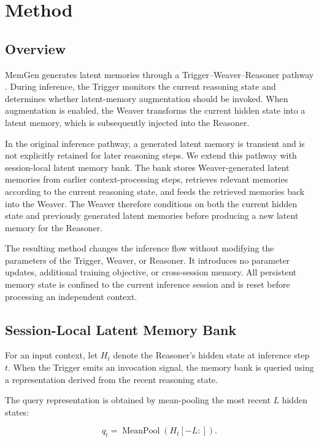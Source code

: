 \section{Method}
\label{sec:method}

\subsection{Overview}

MemGen generates latent memories through a Trigger--Weaver--Reasoner pathway \cite{zhang2025memgen}. During inference, the Trigger monitors the current reasoning state and determines whether latent-memory augmentation should be invoked. When augmentation is enabled, the Weaver transforms the current hidden state into a latent memory, which is subsequently injected into the Reasoner.

In the original inference pathway, a generated latent memory is transient and is not explicitly retained for later reasoning steps. We extend this pathway with session-local latent memory bank. The bank stores Weaver-generated latent memories from earlier context-processing steps, retrieves relevant memories according to the current reasoning state, and feeds the retrieved memories back into the Weaver. The Weaver therefore conditions on both the current hidden state and previously generated latent memories before producing a new latent memory for the Reasoner.

The resulting method changes the inference flow without modifying the parameters of the Trigger, Weaver, or Reasoner. It introduces no parameter updates, additional training objective, or cross-session memory. All persistent memory state is confined to the current inference session and is reset before processing an independent context.

\subsection{Session-Local Latent Memory Bank}

For an input context, let $H_t$ denote the Reasoner's hidden state at inference step $t$. When the Trigger emits an invocation signal, the memory bank is queried using a representation derived from the recent reasoning state.

The query representation is obtained by mean-pooling the most recent $L$ hidden states:

\[
q_t = \operatorname{MeanPool}\left(H_t[-L:]\right).
\]

